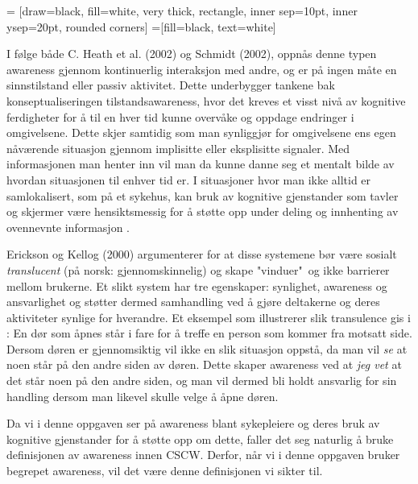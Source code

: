  = [draw=black, fill=white, very thick,
    rectangle, inner sep=10pt, inner ysep=20pt, rounded corners]
 =[fill=black, text=white]
%

\noindent
I følge både C. Heath et al. (2002) \nocite{Heath02} og Schmidt (2002), oppnås denne typen awareness gjennom kontinuerlig interaksjon med andre, og er på ingen måte en sinnstilstand eller passiv aktivitet. Dette underbygger tankene bak konseptualiseringen tilstandsawareness, hvor det kreves et visst nivå av kognitive ferdigheter for å til en hver tid kunne overvåke og oppdage endringer i omgivelsene. Dette skjer samtidig som man synliggjør for omgivelsene ens egen nåværende situasjon gjennom implisitte eller eksplisitte signaler. Med informasjonen man henter inn vil man da kunne danne seg et mentalt bilde av hvordan situasjonen til enhver tid er. I situasjoner hvor man ikke alltid er samlokalisert, som på et sykehus, kan bruk av kognitive gjenstander som tavler og skjermer være hensiktsmessig for å støtte opp under deling og innhenting av ovennevnte informasjon \cite{Bardram04}. 

\noindent
Erickson og Kellog (2000) argumenterer for at disse systemene bør være sosialt \emph{translucent} (på norsk: gjennomskinnelig) og skape "vinduer"\ og ikke barrierer mellom brukerne. Et slikt system har tre egenskaper: synlighet, awareness og ansvarlighet og støtter dermed samhandling ved å gjøre deltakerne og deres aktiviteter synlige for hverandre. Et eksempel som illustrerer slik transulence gis i \cite{Erickson00}: En dør som åpnes står i fare for å treffe en person som kommer fra motsatt side. Dersom døren er gjennomsiktig vil ikke en slik situasjon oppstå, da man vil \emph{se} at noen står på den andre siden av døren. Dette skaper awareness ved at \emph{jeg vet} at det står noen på den andre siden, og man vil dermed bli holdt ansvarlig for sin handling dersom man likevel skulle velge å åpne døren.

\noindent
Da vi i denne oppgaven ser på awareness blant sykepleiere og deres bruk av kognitive gjenstander for å støtte opp om dette, faller det seg naturlig å bruke definisjonen av awareness innen CSCW. Derfor, når vi i denne oppgaven bruker begrepet awareness, vil det være denne definisjonen vi sikter til.

